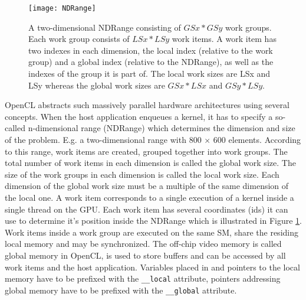 \begin{figure}[h]
\centering
\texttt{[image: NDRange]}
\caption[A two-dimensional NDRange.]{A two-dimensional NDRange consisting of $GSx * GSy$ work groups. Each work group consists of $LSx * LSy$ work items. A work item has two indexes in each dimension, the local index (relative to the work group) and a global index (relative to the NDRange), as well as the indexes of the group it is part of. The local work sizes are LSx and LSy whereas the global work sizes are $GSx * LSx$ and $GSy * LSy$.}
\label{fig:NDRange}
\end{figure}

OpenCL abstracts such massively parallel hardware architectures using several concepts. When the host application enqueues a kernel, it has to specify a so-called n-dimensional range (NDRange) which determines the dimension and size of the problem. E.g. a two-dimensional range with 800 $\times$ 600 elements. According to this range, work items are created, grouped together into work groups. The total number of work items in each dimension is called the global work size. The size of the work groups in each dimension is called the local work size. Each dimension of the global work size must be a multiple of the same dimension of the local one. A work item corresponds to a single execution of a kernel inside a single thread on the GPU. Each work item has several coordinates (ids) it can use to determine it's position inside the NDRange which is illustrated in  Figure \ref{fig:NDRange}. Work items inside a work group are executed on the same SM, share the residing local memory and may be synchronized. The off-chip video memory is called global memory in OpenCL, is used to store buffers and can be accessed by all work items and the host application. Variables placed in and pointers to the local memory have to be prefixed with the \lstinline!__local! attribute, pointers addressing global memory have to be prefixed with the \lstinline!__global! attribute.
